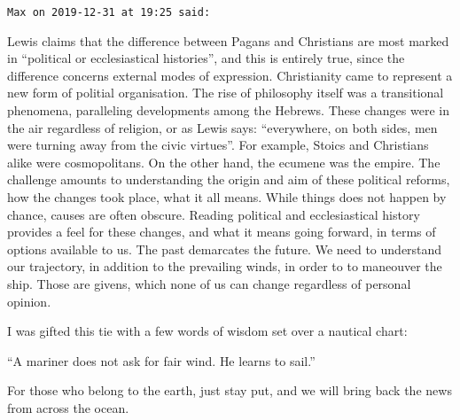 \begin{footnotesize}
\begin{sffamily}
\hfill

\texttt{Max on 2019-12-31 at 19:25 said:}

Lewis claims that the difference between Pagans and Christians are most marked in ``political or ecclesiastical histories'', and this is entirely true, since the difference concerns external modes of expression. Christianity came to represent a new form of politial organisation. The rise of philosophy itself was a transitional phenomena, paralleling developments among the Hebrews. These changes were in the air regardless of religion, or as Lewis says: ``everywhere, on both sides, men were turning away from the civic virtues''. For example, Stoics and Christians alike were cosmopolitans. On the other hand, the ecumene was the empire. The challenge amounts to understanding the origin and aim of these political reforms, how the changes took place, what it all means. While things does not happen by chance, causes are often obscure. Reading political and ecclesiastical history provides a feel for these changes, and what it means going forward, in terms of options available to us. The past demarcates the future. We need to understand our trajectory, in addition to the prevailing winds, in order to to maneouver the ship. Those are givens, which none of us can change regardless of personal opinion.

I was gifted this tie with a few words of wisdom set over a nautical chart:

``A mariner does not ask for fair wind. He learns to sail.''

For those who belong to the earth, just stay put, and we will bring back the news from across the ocean.


\hfill

\end{sffamily}
\end{footnotesize}

